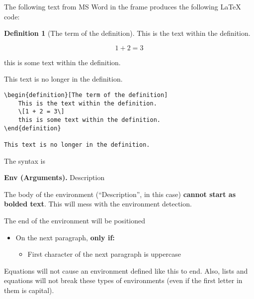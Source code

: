 \documentclass[12pt]{article}
\theoremstyle{plain}
\theoremstyle{remark}
\theoremstyle{definition}
\newtheorem{definition}{Definition}[section]
\begin{document}
The following text from MS Word in the frame produces the following
LaTeX code:

\begin{framed}

\begin{definition}[The term of the definition]
This is the text
within the definition.

\[1 + 2 = 3\]

this is some text within the definition.
\end{definition}

This text is no longer in the definition.

\end{framed}



\begin{verbatim}
\begin{definition}[The term of the definition]
    This is the text within the definition.
    \[1 + 2 = 3\]
    this is some text within the definition.
\end{definition}

This text is no longer in the definition.
\end{verbatim}

The syntax is

\begin{framed}

\textbf{Env (Arguments).} Description

\end{framed}



The body of the environment (``Description'', in this case)
\textbf{cannot start as bolded text}. This will mess with the
environment detection.

The end of the environment will be positioned

\begin{itemize}
\item
  On the next paragraph, \textbf{only if:}

  \begin{itemize}
  \item
    First character of the next paragraph is uppercase
  \end{itemize}
\end{itemize}

Equations will not cause an environment defined like this to end. Also,
lists and equations will not break these types of environments (even if
the first letter in them is capital).
\end{document}

